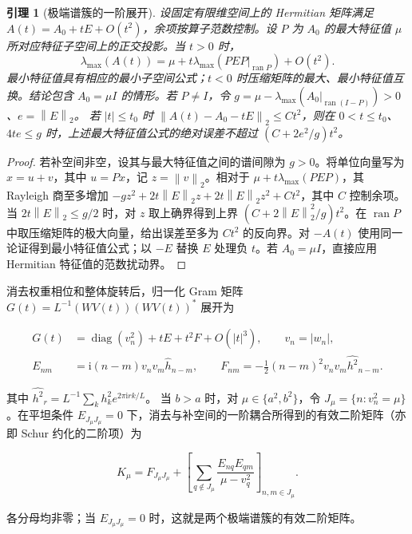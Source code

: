 \documentclass[UTF8,a4paper,zihao=-4,fontset=windows]{ctexart}
\theoremstyle{chinese}
\newtheorem{lemma}[theorem]{引理}
\numberwithin{equation}{section}
\newcommand{\e}{e}\newcommand{\ii}{\mathrm i}
\newcommand{\diag}{\operatorname{diag}}
\newcommand{\norm}[1]{\left\lVert#1\right\rVert_2}
\begin{document}
\begin{lemma}[极端谱簇的一阶展开]\label{lem:clusters}
设固定有限维空间上的 Hermitian 矩阵满足 $A(t)=A_0+tE+O(t^2)$，余项按算子范数控制。设 $P$ 为 $A_0$ 的最大特征值 $\mu$ 所对应特征子空间上的正交投影。当 $t>0$ 时，
\[
\lambda_{\max}(A(t))=\mu+t\lambda_{\max}(PEP|_{\operatorname{ran}P})+O(t^2).
\]
最小特征值具有相应的最小子空间公式；$t<0$ 时压缩矩阵的最大、最小特征值互换。结论包含 $A_0=\mu I$ 的情形。若 $P\ne I$，令
$g=\mu-\lambda_{\max}(A_0|_{\operatorname{ran}(I-P)})>0$、$e=\norm E$。
若 $|t|\le t_0$ 时 $\norm{A(t)-A_0-tE}\le Ct^2$，则在 $0<t\le t_0$、$4te\le g$ 时，上述最大特征值公式的绝对误差不超过 $(C+2e^2/g)t^2$。
\end{lemma}
\begin{proof}
若补空间非空，设其与最大特征值之间的谱间隙为 $g>0$。将单位向量写为 $x=u+v$，其中 $u=Px$，记 $z=\norm v$。相对于 $\mu+t\lambda_{\max}(PEP)$，其 Rayleigh 商至多增加
$-gz^2+2t\norm E z+2t\norm E z^2+Ct^2$，其中 $C$ 控制余项。当 $2t\norm E\le g/2$ 时，对 $z$ 取上确界得到上界 $(C+2\norm E^2/g)t^2$。在 $\operatorname{ran}P$ 中取压缩矩阵的极大向量，给出误差至多为 $Ct^2$ 的反向界。对 $-A(t)$ 使用同一论证得到最小特征值公式；以 $-E$ 替换 $E$ 处理负 $t$。若 $A_0=\mu I$，直接应用 Hermitian 特征值的范数扰动界。
\end{proof}

消去权重相位和整体旋转后，归一化 Gram 矩阵 $G(t)=L^{-1}(WV(t))(WV(t))^*$ 展开为

\begin{equation}\label{eq:gram-second}
\begin{split}
G(t)&=\diag(v_n^2)+tE+t^2F+O(|t|^3),\qquad v_n=|w_n|,\\
E_{nm}&=\ii(n-m)v_nv_m\widehat h_{n-m},\qquad
F_{nm}=-\tfrac12(n-m)^2v_nv_m\widehat{h^2}_{n-m}.
\end{split}
\end{equation}

其中 $\widehat{h^2}_r=L^{-1}\sum_k h_k^2\e^{2\pi\ii rk/L}$。
当 $b>a$ 时，对 $\mu\in\{a^2,b^2\}$，令 $J_\mu=\{n:v_n^2=\mu\}$。在平坦条件 $E_{J_\mu J_\mu}=0$ 下，消去与补空间的一阶耦合所得到的有效二阶矩阵（亦即 Schur 约化的二阶项）为

\begin{equation}\label{eq:effective-second}
K_\mu=F_{J_\mu J_\mu}+
\left[\sum_{q\notin J_\mu}\frac{E_{nq}E_{qm}}{\mu-v_q^2}\right]_{n,m\in J_\mu}.
\end{equation}

各分母均非零；当 $E_{J_\mu J_\mu}=0$ 时，这就是两个极端谱簇的有效二阶矩阵。
\end{document}
